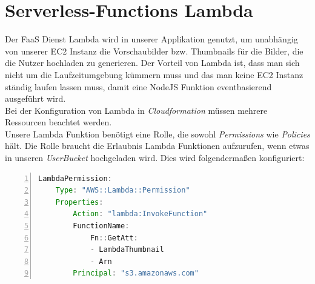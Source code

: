 \documentclass[a4paper, 12pt]{scrreprt}
\renewcommand\_{\textunderscore\allowbreak}
\begin{document}
\section{Serverless-Functions Lambda}
\label{lambda}
Der FaaS Dienst Lambda wird in unserer Applikation genutzt, um unabhängig von unserer EC2 Instanz die Vorschaubilder bzw. Thumbnails für die Bilder, die die Nutzer hochladen zu generieren. Der Vorteil von Lambda ist, dass man sich nicht um die Laufzeitumgebung kümmern muss und das man keine EC2 Instanz ständig laufen lassen muss, damit eine NodeJS Funktion eventbasierend ausgeführt wird. \\ 
Bei der Konfiguration von Lambda in \textit{Cloudformation} müssen mehrere Ressourcen beachtet werden. \\
Unsere Lambda Funktion benötigt eine Rolle, die sowohl \textit{Permissions} wie \textit{Policies} hält. Die Rolle braucht die Erlaubnis Lambda Funktionen aufzurufen, wenn etwas in unseren \textit{UserBucket} hochgeladen wird. Dies wird folgendermaßen konfiguriert:

\begin{lstlisting}[xleftmargin=\parindent,numbers=left,numberstyle=\small,numbersep=8pt,frame=L,mathescape=true, basicstyle=\small, language=Java, lineskip={1.0pt}]
LambdaPermission:
    Type: "AWS::Lambda::Permission"
    Properties: 
        Action: "lambda:InvokeFunction"
        FunctionName:
            Fn::GetAtt:
            - LambdaThumbnail
            - Arn
        Principal: "s3.amazonaws.com"
\end{lstlisting}
\end{document}

